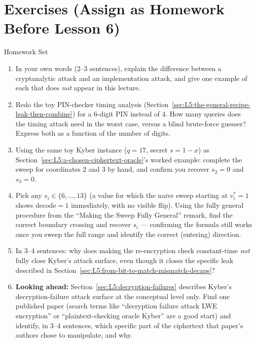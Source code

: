 \section{Exercises (Assign as Homework Before Lesson 6)}
\label{sec:L5:exercises}

\begin{exercisebox}{Homework Set}
\begin{enumerate}[leftmargin=*]
  \item In your own words (2--3 sentences), explain the difference between a cryptanalytic attack and an implementation attack, and give one example of each that does \emph{not} appear in this lecture.
  \item Redo the toy PIN-checker timing analysis (Section~\ref{sec:L5:the-general-recipe-leak-then-combine}) for a 6-digit PIN instead of 4. How many queries does the timing attack need in the worst case, versus a blind brute-force guesser? Express both as a function of the number of digits.
  \item Using the same toy Kyber instance ($q=17$, secret $s=1-x$) as Section~\ref{sec:L5:a-chosen-ciphertext-oracle}'s worked example: complete the sweep for coordinates $2$ and $3$ by hand, and confirm you recover $s_2=0$ and $s_3=0$.
  \item Pick any $s_i \in \{6,\ldots,13\}$ (a value for which the naive sweep starting at $v_i^*=1$ shows decode$=1$ immediately, with no visible flip). Using the fully general procedure from the ``Making the Sweep Fully General'' remark, find the correct boundary crossing and recover $s_i$ --- confirming the formula still works once you sweep the full range and identify the correct (entering) direction.
  \item In 3--4 sentences: why does making the re-encryption check constant-time \emph{not} fully close Kyber's attack surface, even though it closes the specific leak described in Section~\ref{sec:L5:from-bit-to-match-mismatch-decaps}?
  \item \textbf{Looking ahead:} Section~\ref{sec:L5:decryption-failures} describes Kyber's decryption-failure attack surface at the conceptual level only. Find one published paper (search terms like ``decryption failure attack LWE encryption'' or ``plaintext-checking oracle Kyber'' are a good start) and identify, in 3--4 sentences, which specific part of the ciphertext that paper's authors chose to manipulate, and why.
\end{enumerate}
\end{exercisebox}
